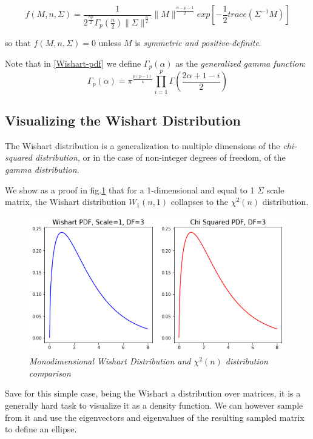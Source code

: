 \documentclass[12pt,openright,twoside,a4paper]{book}
\begin{document}
\begin{equation}
f(M, n, \Sigma)=\frac{1}{2^{\frac{np}{2}}\Gamma_p(\frac{n}{2})\|\Sigma\|^{\frac{n}{2}}}\|M\|^{\frac{n-p-1}{2}}exp[-\frac{1}{2}trace(\Sigma^{-1}M)]
\label{Wishart-pdf}
\end{equation} 

so that $f(M, n, \Sigma)=0$ unless $M$ is \textit{symmetric and positive-definite}. \cite{IMS}

Note that in \ref{Wishart-pdf} we define $\Gamma_p(\alpha)$ as the \textit{generalized gamma function}:
\begin{equation}
\Gamma_p(\alpha)=\pi^\frac{p(p-1)}{4}\prod_{i=1}^p\Gamma(\frac{2\alpha+1-i}{2})
\end{equation}

\subsection{Visualizing the Wishart Distribution}

The Wishart distribution is a generalization to multiple dimensions of the \textit{chi-squared distribution}, or in the case of non-integer degrees of freedom, of the \textit{gamma distribution}.

We show as a proof in fig.\ref{Wish-chi2} that for a 1-dimensional and equal to 1 $\Sigma$ scale matrix, the Wishart distribution $W_1(n,1)$ collapses to the $\chi^2(n)$ distribution.

\begin{figure}[!h]
\centering
\includegraphics[scale=0.37]{wish-chi}
\caption{\textit{Monodimensional Wishart Distribution and $\chi^2(n)$ distribution comparison}}
\label{Wish-chi2}
\end{figure}

Save for this simple case, being the Wishart a distribution over matrices, it is a generally hard task to visualize it as a density function.
We can however sample from it and use the eigenvectors and eigenvalues of the resulting sampled matrix to define an ellipse.
\end{document}
